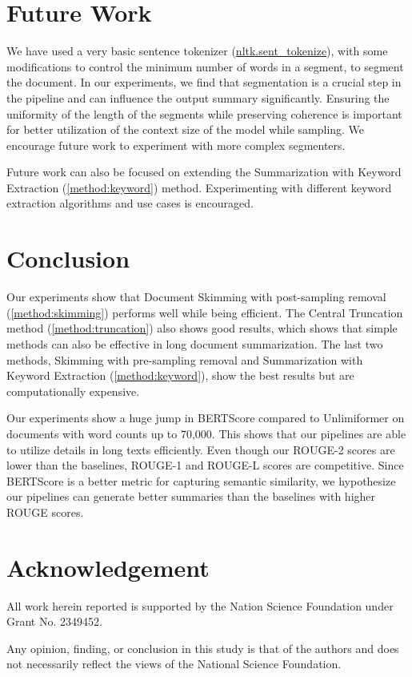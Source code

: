 \section{Future Work}
	\label{sec:future-work}

	We have used a very basic sentence tokenizer
	(\href{https://www.nltk.org/api/nltk.tokenize.sent_tokenize.html}{nltk.sent\_tokenize}),
	with some modifications to control the minimum number of words in a segment,
	to segment the document.
	In our experiments, we find that segmentation is a crucial step in the pipeline and can
	influence the output summary significantly.
	Ensuring the uniformity of the length of the segments while preserving coherence is
	important for better utilization of the context size of the model while sampling.
	We encourage future work to experiment with more complex segmenters.

	Future work can also be focused on extending the Summarization with Keyword Extraction
	(\ref{method:keyword}) method.
	Experimenting with different keyword extraction algorithms and use cases is encouraged.


\section{Conclusion}
\label{sec:conclusion}

	Our experiments show that Document Skimming with post-sampling removal
	(\ref{method:skimming}) performs well while being efficient.
	The Central Truncation method (\ref{method:truncation}) also shows good results,
	which shows that simple methods can also be effective in long document summarization.
	The last two methods, Skimming with pre-sampling removal and Summarization with Keyword
	Extraction (\ref{method:keyword}), show the best results but are computationally expensive.

	Our experiments show a huge jump in BERTScore compared to Unlimiformer on documents
	with word counts up to 70,000.
	This shows that our pipelines are able to utilize details in long texts efficiently.
	Even though our ROUGE-2 scores are lower than the baselines, ROUGE-1 and ROUGE-L
	scores are competitive.
	Since BERTScore is a better metric for capturing semantic similarity, we hypothesize
	our pipelines can generate better summaries than the baselines with higher ROUGE scores.


\section*{Acknowledgement}

	All work herein reported is supported by the Nation Science Foundation under Grant
	No. 2349452.

	Any opinion, finding, or conclusion in this study is that of the authors and does not
	necessarily reflect the views of the National Science Foundation.
